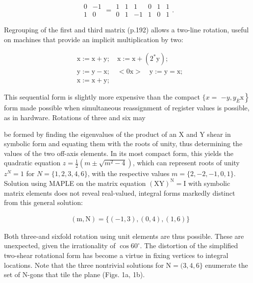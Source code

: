 \begin{CJK}{UTF8}{gbsn}
$$
\begin{array}{cc}
0 & -1 \\
1 & 0
\end{array}=\begin{array}{cccccc}
1 & 1 & 1 & 0 & 1 & 1 \\
0 & 1 & -1 & 1 & 0 & 1
\end{array} .
$$

Regrouping of the first and third matrix (p.192) allows a two-line rotation, useful on machines that provide an implicit multiplication by two:

$$
\begin{aligned}
& \mathrm{x}:=\mathrm{x}+\mathrm{y} ; \quad \mathrm{x}:=\mathrm{x}+\left(2^{*} \mathrm{y}\right) ; \\
& \mathrm{y}:=\mathrm{y}-\mathrm{x} ; \quad<0 \mathrm{x}>\quad \mathrm{y}:=\mathrm{y}=\mathrm{x} ; \\
& \mathrm{x}:=\mathrm{x}+\mathrm{y} \text {; }
\end{aligned}
$$

This sequential form is slightly more expensive than the compact $\{x=$ $\left.-y, y_{\bar{E}} \mathrm{x}\right\}$ form made possible when simultaneous reassignment of register values is possible, as in hardware. Rotations of three and six may

be formed by finding the eigenvalues of the product of an $\mathrm{X}$ and $\mathrm{Y}$ shear in symbolic form and equating them with the roots of unity, thus determining the values of the two off-axis elements. In its most compact form, this yields the quadratic equation $z=\frac{1}{2}\left(m \pm \sqrt{m^{2}-4}\right)$, which can represent roots of unity $z^{N}=1$ for $N=\{1,2,3,4,6\}$, with the respective values $m=\{2,-2,-1,0,1\}$. Solution using MAPLE on the matrix equation $(\mathrm{XY})^{\mathrm{N}}=\mathrm{I}$ with symbolic matrix elements does not reveal real-valued, integral forms markedly distinct from this general solution:

$$
\begin{aligned}
& (\mathrm{m}, \mathrm{N})=\{(-1,3),(0,4),(1,6)\}
\end{aligned}
$$

Both three-and sixfold rotation using unit elements are thus possible. These are unexpected, given the irrationality of $\cos 60^{\circ}$. The distortion of the simplified two-shear rotational form has become a virtue in fixing vertices to integral locations. Note that the three nontrivial solutions for $\mathrm{N}=(3,4,6\}$ enumerate the set of $\mathrm{N}$-gons that tile the plane (Figs. 1a, 1b).


\end{CJK}
